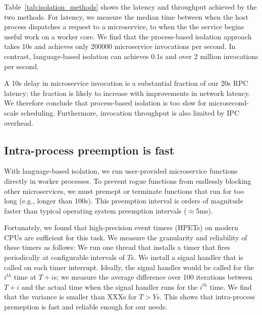 Table~\ref{tab:isolation_methods} shows the latency and throughput achieved
by the two methods. For latency, we measure the median time between when the host
process dispatches a request to a microservice, to when the the service begins
useful work on a worker core. We find that the process-based isolation approach
takes 10\textmu{}s and achieves only 200000 microservice invocations per
second. In contrast, language-based isolation can achieves 0.1\textmu{}s and
over 2 million invocations per second.


A 10\textmu{}s delay in microservice invocation is a substantial fraction of our
20\textmu{}s RPC latency; the fraction is likely to increase with
improvements in network latency. We therefore conclude that process-based
isolation is too slow for microsecond-scale scheduling. Furthermore, invocation
throughput is also limited by IPC overhead.

\subsection{Intra-process preemption is fast}
With language-based isolation, we run user-provided microservice functions
directly in worker processes. To prevent rogue functions from endlessly blocking
other microservices, we must premept or terminate functions that run for too
long (e.g., longer than 100\textmu{}s).  This
preemption interval is orders of magnitude faster than typical operating
system preemption intervals ($\approx$5ms).

Fortunately, we found that high-precision event timers (HPETs) on modern CPUs
are sufficient for this task. We measure the granularity and reliability of
these timers as follows: We run one thread that installs a timer that fires
periodically at configurable intervals of $T$\textmu{}s. We install a signal
handler that is called on each timer interrupt. Ideally, the signal handler
would be called for the $i^{th}$ time at $T + i$\textmu{}s; we measure the
average difference over 100 iterations between $T + i$ and the actual time
when the signal handler runs for the $i^{th}$ time. We find that the variance
is smaller than XXX\textmu{}s for $T > Y$\textmu{}s. This shows that
intra-process premeption is fast and reliable enough for our needs.
